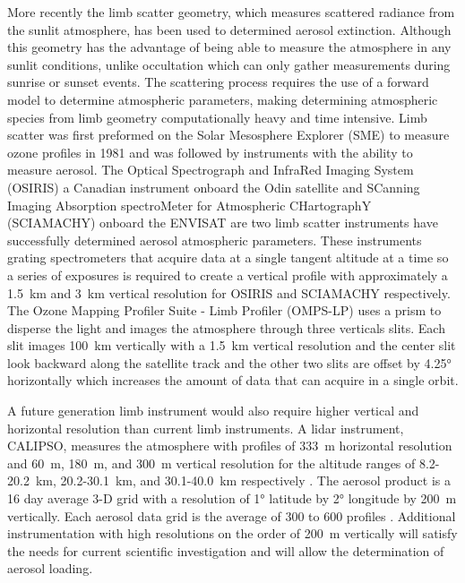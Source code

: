 \documentclass[12pt]{article}
\begin{document}
More recently the limb scatter geometry, which measures scattered radiance from the sunlit atmosphere, has been used to determined aerosol extinction. Although this geometry has the advantage of being able to measure the atmosphere in any sunlit conditions, unlike occultation which can only gather measurements during sunrise or sunset events. The scattering process requires the use of a forward model to determine atmospheric parameters, making determining atmospheric species from limb geometry computationally heavy and time intensive. Limb scatter was first preformed on the Solar Mesosphere Explorer (SME) \citep{Barth1983} to measure ozone profiles in 1981 and was followed by instruments with the ability to measure aerosol. The Optical Spectrograph and InfraRed Imaging System (OSIRIS) a Canadian instrument onboard the Odin satellite \citep{Llewellyn2004} and SCanning Imaging Absorption spectroMeter for Atmospheric CHartographY (SCIAMACHY) onboard the ENVISAT \citep{Bovensmann1999} are two limb scatter instruments have successfully determined aerosol atmospheric parameters. These instruments grating spectrometers that acquire data at a single tangent altitude at a time so a series of exposures is required to create a vertical profile with approximately a 1.5~km and 3~km vertical resolution for OSIRIS and SCIAMACHY respectively. The Ozone Mapping Profiler Suite - Limb Profiler (OMPS-LP) \citep{Rault2013} uses a prism to disperse the light and images the atmosphere through three verticals slits. Each slit images 100~km vertically with a 1.5~km vertical resolution and the center slit look backward along the satellite track and the other two slits are offset by 4.25\si{\degree} horizontally which increases the amount of data that can acquire in a single orbit.

A future generation limb instrument would also require higher vertical and horizontal resolution than current limb instruments. A lidar instrument, CALIPSO, measures the atmosphere with profiles of 333~m horizontal resolution and 60~m, 180~m, and 300~m vertical resolution for the altitude ranges of 8.2-20.2~km, 20.2-30.1~km, and 30.1-40.0~km respectively \citep{Winker2003}. The aerosol product is a 16 day average 3-D grid with a resolution of 1\si{\degree} latitude by 2\si{\degree} longitude by 200~m vertically. Each aerosol data grid is the average of 300 to 600 profiles \citep{Vernier2009}. Additional instrumentation with high resolutions on the order of 200~m vertically will satisfy the needs for current scientific investigation and will allow the determination of aerosol loading.
\end{document}
